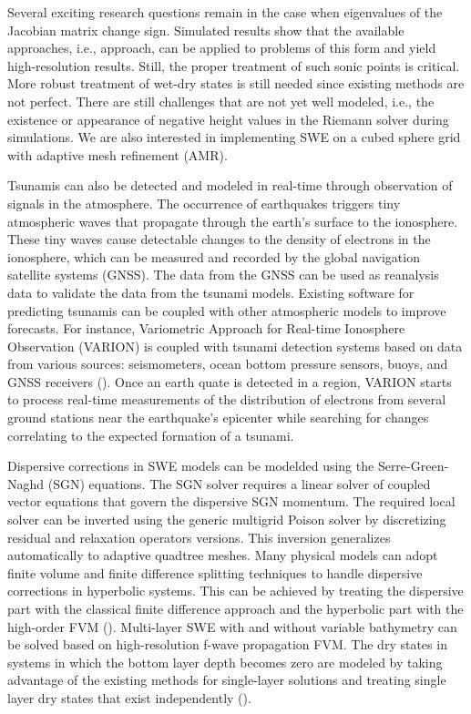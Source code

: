 \documentclass[10pt,a4paper]{article}
\begin{document}
Several exciting research questions remain in the case when eigenvalues of the Jacobian matrix change sign. Simulated results show that the available approaches, i.e.,  \citet{ba-le-mi-ro:2003} approach, can be applied to problems of this form and yield high-resolution results. Still, the proper treatment of such sonic points is critical.
More robust treatment of wet-dry states is still needed since existing methods are not perfect. There are still challenges that are not yet well modeled, i.e., the existence or appearance of negative height values in the Riemann solver during simulations.
We are also interested in implementing SWE on a cubed sphere grid with adaptive mesh refinement (AMR).  
	

Tsunamis can also be detected and modeled in real-time through observation of signals in the atmosphere. The occurrence of earthquakes triggers tiny atmospheric waves that propagate through the earth's surface to the ionosphere. These tiny waves cause detectable changes to the density of electrons in the ionosphere, which can be measured and recorded by the global navigation satellite systems (GNSS).  The data from the GNSS can be used as reanalysis data to validate the data from the tsunami models. Existing software for predicting tsunamis can be coupled with other atmospheric models to improve forecasts. For instance, Variometric Approach for Real-time Ionosphere Observation (VARION)  is coupled with tsunami detection systems based on data from various sources: seismometers, ocean bottom pressure sensors, buoys, and GNSS receivers (\cite{savastano2017real}). Once an earth quate is detected in a region, VARION starts to process real-time measurements of the distribution of electrons from several ground stations near the earthquake's epicenter while searching for changes correlating to the expected formation of a tsunami.
 
          
Dispersive corrections in SWE models can be modelded using the Serre-Green-Naghd (SGN) equations. The SGN solver requires a linear solver of coupled vector equations that govern the dispersive SGN momentum.  The required local solver can be inverted using the generic multigrid Poison solver by discretizing residual and relaxation operators versions. This inversion generalizes automatically to adaptive quadtree meshes. Many physical models can adopt finite volume and finite difference splitting techniques to handle dispersive corrections in hyperbolic systems.  This can be achieved by treating the dispersive part with the classical finite difference approach and the hyperbolic part with the high-order FVM (\cite{la-bo:2009,po:2020,po:2015}). 
Multi-layer SWE with and without variable bathymetry can be solved based on high-resolution f-wave propagation FVM. The dry states in systems in which the bottom layer depth becomes zero are modeled by taking advantage of the existing methods for single-layer solutions and treating single layer dry states that exist independently (\cite{mandli2013numerical}).
\end{document}

